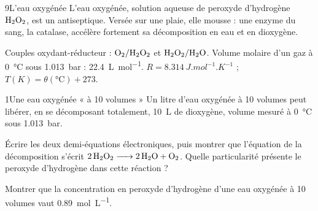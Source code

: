 

\begin{exoBac}{9}{L'eau oxygénée}
L'eau oxygénée, solution aqueuse de peroxyde d'hydrogène $\ce{H2O2}$, est un antiseptique. Versée sur une plaie, elle
mousse : une enzyme du sang, la catalase, accélère fortement sa décomposition en eau et en dioxygène.
\begin{donnees}
Couples oxydant-réducteur : $\ce{O2}/\ce{H2O2}$ et $\ce{H2O2}/\ce{H2O}$. Volume molaire d'un gaz à \qty{0}{\degreeCelsius} sous \qty{1,013}{bar} :
\qty{22,4}{L.mol^{-1}}. $R=\qty{8,314}{J.mol^{-1}.K^{-1}}$ ; $T(\unit{K})=\theta(\unit{\degreeCelsius})+273$.
\end{donnees}

\begin{docu}{1}{Une eau oxygénée « à 10 volumes »}
Un litre d'eau oxygénée à 10 volumes peut libérer, en se décomposant totalement, \qty{10}{L} de dioxygène, volume
mesuré à \qty{0}{\degreeCelsius} sous \qty{1,013}{bar}.
\end{docu}
\begin{questions}
\item Écrire les deux demi-équations électroniques, puis montrer que l'équation de la décomposition s'écrit
$\ce{2H2O2 -> 2H2O + O2}$. Quelle particularité présente le peroxyde d'hydrogène dans cette réaction ?
\item Montrer que la concentration en peroxyde d'hydrogène d'une eau oxygénée à 10 volumes vaut \qty{0,89}{mol.L^{-1}}.
\end{questions}


\end{exoBac}
